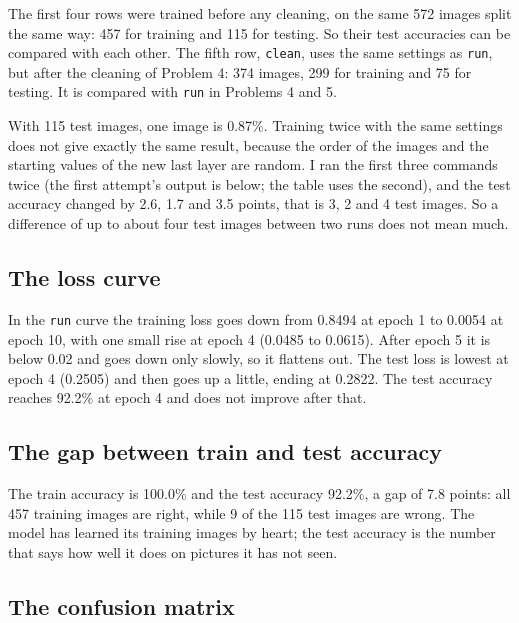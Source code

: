 \documentclass[11pt]{article}
\begin{document}
The first four rows were trained before any cleaning, on the same 572 images
split the same way: 457 for training and 115 for testing. So their test
accuracies can be compared with each other. The fifth row, \texttt{clean}, uses
the same settings as \texttt{run}, but after the cleaning of Problem 4: 374
images, 299 for training and 75 for testing. It is compared with \texttt{run} in
Problems 4 and 5.

With 115 test images, one image is 0.87\%. Training twice with the same settings
does not give exactly the same result, because the order of the images and the
starting values of the new last layer are random. I ran the first three
commands twice (the first attempt's output is below; the table uses the second),
and the test accuracy changed by 2.6, 1.7 and 3.5 points, that is 3, 2 and 4
test images. So a difference of up to about four test images between two runs
does not mean much.


\subsection*{The loss curve}


In the \texttt{run} curve the training loss goes down from 0.8494 at epoch 1 to
0.0054 at epoch 10, with one small rise at epoch 4 (0.0485 to 0.0615). After
epoch 5 it is below 0.02 and goes down only slowly, so it flattens out. The test
loss is lowest at epoch 4 (0.2505) and then goes up a little, ending at 0.2822.
The test accuracy reaches 92.2\% at epoch 4 and does not improve after that.

\subsection*{The gap between train and test accuracy}

The train accuracy is 100.0\% and the test accuracy 92.2\%, a gap of 7.8 points:
all 457 training images are right, while 9 of the 115 test images are wrong. The
model has learned its training images by heart; the test accuracy is the number
that says how well it does on pictures it has not seen.

\subsection*{The confusion matrix}
\end{document}
